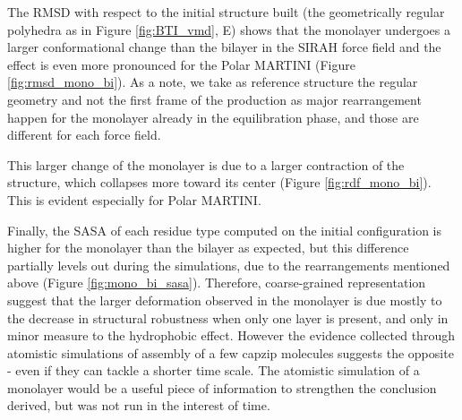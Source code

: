 The RMSD with respect to the initial structure built (the geometrically regular polyhedra as in Figure \ref{fig:BTI_vmd}, E) shows that the monolayer undergoes a larger conformational change than the bilayer in the SIRAH force field and the effect is even more pronounced for the Polar MARTINI (Figure \ref{fig:rmsd_mono_bi}). 
%
As a note, we take as reference structure the regular geometry and not the first frame of the production as major rearrangement happen for the monolayer already in the equilibration phase, and those are different for each force field.

This larger change of the monolayer is due to a larger contraction of the structure, which collapses more toward its center (Figure \ref{fig:rdf_mono_bi}).
%
This is evident especially for Polar MARTINI.
%

Finally, the SASA of each residue type computed on the initial configuration is higher for the monolayer than the bilayer as expected, but this difference partially levels out during the simulations, due to the rearrangements mentioned above (Figure \ref{fig:mono_bi_sasa}). Therefore, coarse-grained representation suggest that the larger deformation observed in the monolayer is due mostly to the decrease in structural robustness when only one layer is present, and only in minor measure to the hydrophobic effect.
%
However the evidence collected through atomistic simulations of assembly of a few capzip molecules suggests the opposite - even if they can tackle a shorter time scale.
The atomistic simulation of a monolayer would be a useful piece of information to strengthen the conclusion derived, but was not run in the interest of time.

